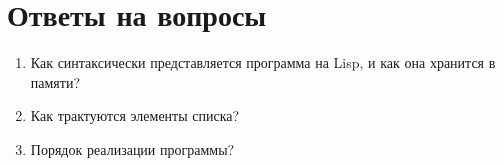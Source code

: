\newpage
\section*{Ответы на вопросы}
\begin{enumerate}
    \item\Large{Как синтаксически представляется программа на Lisp, и как она хранится в памяти?}\\
    \item\Large{Как трактуются элементы списка?}\\
    \item\Large{Порядок реализации программы?}\\
\end{enumerate}

